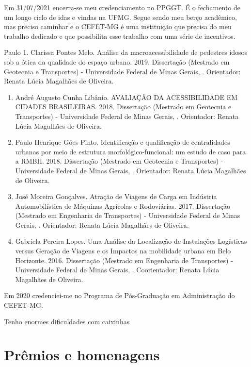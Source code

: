 \documentclass[
]{book}
\begin{document}
Em 31/07/2021 encerra-se meu credenciamento no PPGGT. É o fechamento de
um longo ciclo de idas e vindas na UFMG. Segue sendo meu berço
acadêmico, mas preciso caminhar e o CEFET-MG é uma instituição que
precisa do meu trabalho dedicado e que possibilita esse trabalho com uma
série de incentivos.

Paulo 1. Clarissa Pontes Melo. Análise da macroacessibilidade de
pedestres idosos sob a ótica da qualidade do espaço urbano. 2019.
Dissertação (Mestrado em Geotecnia e Transportes) - Universidade Federal
de Minas Gerais, . Orientador: Renata Lúcia Magalhães de Oliveira.

\begin{enumerate}
\def\labelenumi{\arabic{enumi}.}
\setcounter{enumi}{1}
\item
  André Augusto Cunha Libânio. AVALIAÇÃO DA ACESSIBILIDADE EM CIDADES
  BRASILEIRAS. 2018. Dissertação (Mestrado em Geotecnia e Transportes) -
  Universidade Federal de Minas Gerais, . Orientador: Renata Lúcia
  Magalhães de Oliveira.
\item
  Paulo Henrique Góes Pinto. Identificação e qualificação de
  centralidades urbanas por meio de estrutura morfológico-funcional: um
  estudo de caso para a RMBH. 2018. Dissertação (Mestrado em Geotecnia e
  Transportes) - Universidade Federal de Minas Gerais, . Orientador:
  Renata Lúcia Magalhães de Oliveira.
\item
  José Moreira Gonçalves. Atração de Viagens de Carga em Indústria
  Automobilística de Máquinas Agrícolas e Rodoviárias. 2017. Dissertação
  (Mestrado em Engenharia de Transportes) - Universidade Federal de
  Minas Gerais, . Orientador: Renata Lúcia Magalhães de Oliveira.
\item
  Gabriela Pereira Lopes. Uma Análise da Localização de Instalações
  Logísticas versus Geração de Viagens e os Impactos na mobilidade
  urbana em Belo Horizonte. 2016. Dissertação (Mestrado em Engenharia de
  Transportes) - Universidade Federal de Minas Gerais, . Coorientador:
  Renata Lúcia Magalhães de Oliveira.
\end{enumerate}

Em 2020 credenciei-me no Programa de Pós-Graduação em Administração do
CEFET-MG.

Tenho enormes dificuldades com caixinhas

\hypertarget{pruxeamios-e-homenagens}{%
\section{Prêmios e homenagens}\label{pruxeamios-e-homenagens}}
\end{document}
